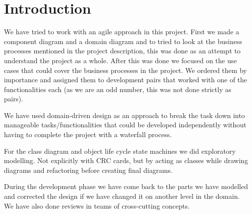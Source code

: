 \chapter{Introduction}
\madeby{\kj}{\mb}
We have tried to work with an agile approach in this project. First we made a component diagram and a domain diagram and to tried to look at the business processes mentioned in the project description, this was done as an attempt to understand the project as a whole. After this was done we focused on the use cases that could cover the business processes in the project. We ordered them by importance and assigned them to development pairs that worked with one of the functionalities each (as we are an odd number, this was not done strictly as pairs).

We have used domain-driven design as an approach to break the task down into manageable tasks/functionalities that could be developed independently without having to complete the project with a waterfall process.
 
For the class diagram and object life cycle state machines we did exploratory modelling. Not explicitly with CRC cards, but by acting as classes while drawing diagrams and refactoring before creating final diagrams.

During the development phase we have come back to the parts we have modelled and corrected the design if we have changed it on another level in the domain. We have also done reviews in teams of cross-cutting concepts.